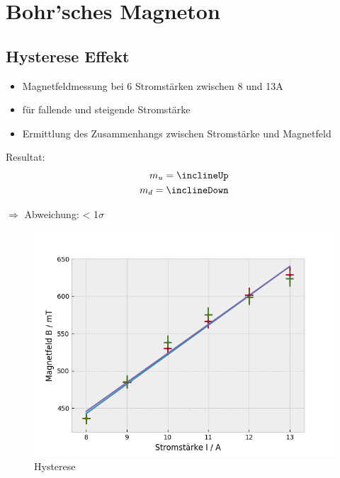 
\section{Bohr'sches Magneton}
  \subsection{Hysterese Effekt}
    \begin{myframe}{\subsecname}
      \begin{itemize}
        \item Magnetfeldmessung bei 6 Stromstärken zwischen 8 und 13A
        \item für fallende und steigende Stromstärke
        \item Ermittlung des Zusammenhangs zwischen Stromstärke und Magnetfeld
      \end{itemize}

      Resultat:
      \begin{align}
        m_u = \inclineUp\\
        m_d = \inclineDown
      \end{align}

      $\Rightarrow$ Abweichung: < 1$\sigma$
    \end{myframe}

    \begin{myframe}{}
        \begin{figure}
          \includegraphics[height=.85\paperheight]{img/hysteresis.png}
          \caption{Hysterese}
          \label{Hysterese}
        \end{figure}
    \end{myframe}

